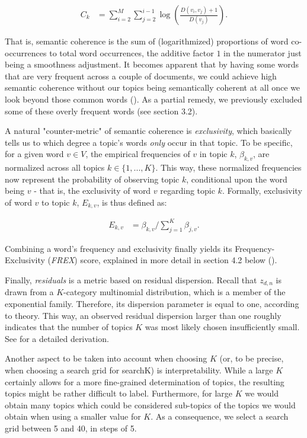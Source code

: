\documentclass[12pt]{article}
\begin{document}
\begin{align*}
C_{k} &= \sum_{i=2}^{M}\sum_{j=2}^{i-1}\log(\frac{D(v_{i}, v_{j})+1}{D(v_{j})}).
\end{align*}

That is, semantic coherence is the sum of (logarithmized) proportions of word co-occurrences to total word occurrences, the additive factor $1$ in the numerator just being a smoothness adjustment. It becomes apparent that by having some words that are very frequent across a couple of documents, we could achieve high semantic coherence without our topics being semantically coherent at all once we look beyond those common words (\citealp{stm, mimno2011optimizing}). As a partial remedy, we previously excluded some of these overly frequent words (see section 3.2).

A natural "counter-metric" of semantic coherence is \textit{exclusivity}, which basically tells us to which degree a topic's words \textit{only} occur in that topic. To be specific, for a given word $v\in{V}$, the empirical frequencies of $v$ in topic $k$, $\beta_{k,v}$, are normalized across all topics $k\in\{1,...,K\}$. This way, these normalized frequencies now represent the probability of observing topic $k$, conditional upon the word being $v$ - that is, the exclusivity of word $v$ regarding topic $k$. Formally, exclusivity of word $v$ to topic $k$, $E_{k,v}$, is thus defined as:

\begin{align*}
E_{k,v} &= \beta_{k,v}/\sum_{j=1}^{K}\beta_{j,v}.
\end{align*}

Combining a word's frequency and exclusivity finally yields its Frequency-Exclusivity (\textit{FREX}) score, explained in more detail in section 4.2 below (\citealp{bischof2012summarizing}).

Finally, \textit{residuals} is a metric based on residual dispersion. Recall that $z_{d,n}$ is drawn from a $K$-category multinomial distribution, which is a member of the exponential family. Therefore, its dispersion parameter is equal to one, according to theory. This way, an observed residual dispersion larger than one roughly indicates that the number of topics $K$ was most likely chosen insufficiently small. See \cite{taddy2012estimation} for a detailed derivation.

Another aspect to be taken into account when choosing $K$ (or, to be precise, when choosing a search grid for searchK) is interpretability. While a large $K$ certainly allows for a more fine-grained determination of topics, the resulting topics might be rather difficult to label. Furthermore, for large $K$ we would obtain many topics which could be considered sub-topics of the topics we would obtain when using a smaller value for $K$. As a consequence, we select a search grid between 5 and 40, in steps of 5.
\end{document}
